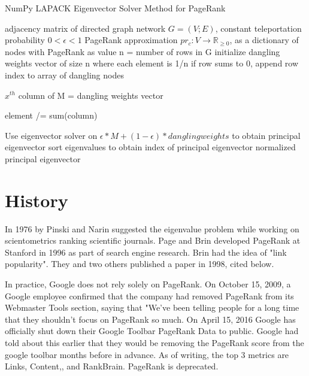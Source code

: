 \documentclass[10pt]{siamltex}
\begin{document}
\begin{algorithm}                      %
\caption{NumPy LAPACK Eigenvector Solver Method for PageRank \cite{hagberg-2008-exploring}}          %
\label{alg1}                           %
\begin{algorithmic}                    %
    \REQUIRE adjacency matrix of directed graph network $G = (V; E)$, constant teleportation probability $0 < \epsilon < 1$
\RETURN PageRank approximation $pr_{c}: V \rightarrow \mathbb{R}_{\geq 0}$, as a dictionary of nodes with PageRank as value
    \STATE n = number of rows in G
    \STATE initialize dangling weights vector of size n where each element is 1/n
       \STATE if row sums to 0, append row index to array of dangling nodes
    \ENDFOR
    
    \STATE $x^{th}$ column of M = dangling weights vector
    \ENDFOR
    
            \STATE element /= sum(column)
        \ENDFOR
   \ENDFOR
   
   \STATE Use eigenvector solver on  $\epsilon * M + (1 - \epsilon) * dangling weights$ to obtain principal eigenvector
    \STATE sort eigenvalues to obtain index of principal eigenvector
    \RETURN normalized principal eigenvector

\end{algorithmic}
\end{algorithm}

\section{History}
In 1976 by Pinski and Narin suggested the eigenvalue problem while working on scientometrics ranking scientific journals.  Page and Brin developed PageRank at Stanford in 1996 as part of search engine research.  Brin had the idea of "link popularity".  They and two others published a paper in 1998, cited below. \cite{ilprints422}

In practice, Google does not rely solely on PageRank.  On October 15, 2009, a Google employee confirmed that the company had removed PageRank from its Webmaster Tools section, saying that "We've been telling people for a long time that they shouldn't focus on PageRank so much.  On April 15, 2016 Google has officially shut down their Google Toolbar PageRank Data to public. Google had told about this earlier that they would be removing the PageRank score from the google toolbar months before in advance.  As of writing, the top 3 metrics are Links, Content,, and RankBrain.  PageRank is deprecated.\cite{wiki:PageRank}
\end{document}

